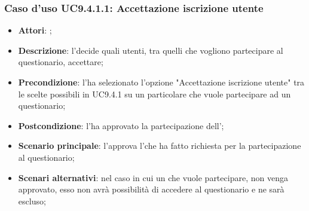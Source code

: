 			 \subsubsection{Caso d'uso UC9.4.1.1: Accettazione iscrizione utente}
			 \label{UC9.4.1.1}
			 \begin{itemize}
			 	\item \textbf{Attori}: \uaupro;
			 	\item \textbf{Descrizione}: l'\uaupro decide quali utenti, tra quelli che vogliono partecipare al questionario, accettare; 
			 	\item \textbf{Precondizione}: l'\uaupro ha selezionato l'opzione "Accettazione iscrizione utente" tra le scelte possibili in UC9.4.1 su un particolare \uaupro che vuole partecipare ad un questionario;
			 	\item \textbf{Postcondizione}: l'\uaupro ha approvato la partecipazione dell'\uaupro;
			 	\item \textbf{Scenario principale}: l'\uaupro approva l'\uaupro che ha fatto richiesta per la partecipazione al questionario; 
			 	\item \textbf{Scenari alternativi}: nel caso in cui un \uaupro che vuole partecipare, non venga approvato, esso non avrà possibilità di accedere al questionario e ne sarà escluso;
			 \end{itemize}
			
				